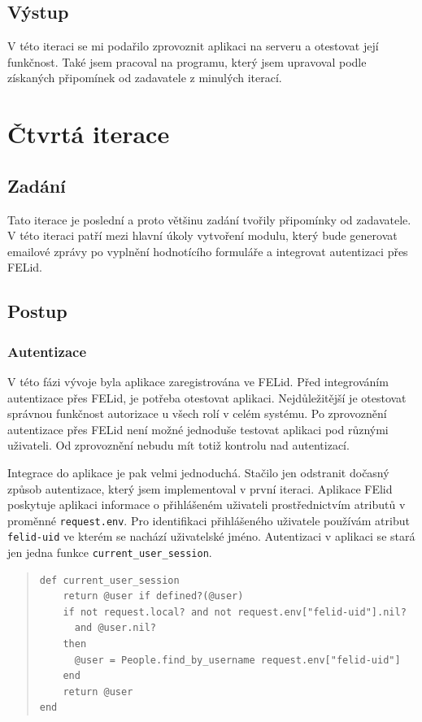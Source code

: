 \subsection{Výstup} 
V této iteraci se mi podařilo zprovoznit aplikaci na serveru a otestovat její funkčnost. Také jsem pracoval na programu, který jsem upravoval podle získaných připomínek od zadavatele z minulých iterací.

\section{Čtvrtá iterace}
\subsection{Zadání}
Tato iterace je poslední a proto většinu zadání tvořily připomínky od zadavatele. V této iteraci patří mezi hlavní úkoly vytvoření modulu, který bude generovat emailové zprávy po vyplnění hodnotícího formuláře a integrovat autentizaci přes FELid. 
\subsection{Postup}
\subsubsection{Autentizace}
V této fázi vývoje byla aplikace zaregistrována ve FELid. Před integrováním autentizace přes FELid, je potřeba otestovat aplikaci. Nejdůležitější je otestovat správnou funkčnost autorizace u všech rolí v celém systému. Po zprovoznění autentizace přes FELid není možné jednoduše testovat aplikaci pod různými uživateli. Od zprovoznění nebudu mít totiž kontrolu nad autentizací.

Integrace do aplikace je pak velmi jednoduchá. Stačilo jen odstranit dočasný způsob autentizace, který jsem implementoval v první iteraci. Aplikace FElid poskytuje aplikaci informace o přihlášeném uživateli prostřednictvím atributů v proměnné \verb|request.env|. Pro identifikaci přihlášeného uživatele používám atribut \verb|felid-uid| ve kterém se nachází uživatelské jméno. Autentizaci v aplikaci se stará jen jedna funkce \verb|current_user_session|.

\begin{quote}
\begin{verbatim}
def current_user_session
    return @user if defined?(@user)
    if not request.local? and not request.env["felid-uid"].nil? 
      and @user.nil? 
    then
      @user = People.find_by_username request.env["felid-uid"]
    end
    return @user
end
\end{verbatim} 
\end{quote}

